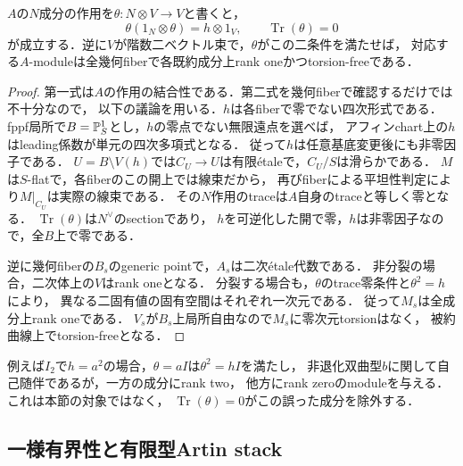 \begin{lemma}[trace零は非被約基底でも成立する]
\label{lem:qa-tf-trace-zero}
$A$の$N$成分の作用を$\theta:N\otimes V\to V$と書くと，
\[
 \theta(1_N\otimes\theta)=h\otimes1_V,
 \qquad\operatorname{Tr}(\theta)=0
\]
が成立する．逆に$V$が階数二ベクトル束で，$\theta$がこの二条件を満たせば，
対応する$A$-moduleは全幾何fiberで各既約成分上rank oneかつtorsion-freeである．
\end{lemma}
\begin{proof}
第一式は$A$の作用の結合性である．第二式を幾何fiberで確認するだけでは不十分なので，
以下の議論を用いる．$h$は各fiberで零でない四次形式である．
fppf局所で$B=\mathbb P^1_S$とし，$h$の零点でない無限遠点を選べば，
アフィンchart上の$h$はleading係数が単元の四次多項式となる．
従って$h$は任意基底変更後にも非零因子である．
$U=B\setminus V(h)$では$C_U\to U$は有限\'etaleで，$C_U/S$は滑らかである．
$M$は$S$-flatで，各fiberのこの開上では線束だから，
再びfiberによる平坦性判定により$M|_{C_U}$は実際の線束である．
その$N$作用のtraceは$A$自身のtraceと等しく零となる．
$\operatorname{Tr}(\theta)$は$N^\vee$のsectionであり，
$h$を可逆化した開で零，$h$は非零因子なので，全$B$上で零である．

逆に幾何fiberの$B_s$のgeneric pointで，$A_s$は二次\'etale代数である．
非分裂の場合，二次体上の$V$はrank oneとなる．
分裂する場合も，$\theta$のtrace零条件と$\theta^2=h$により，
異なる二固有値の固有空間はそれぞれ一次元である．
従って$M_s$は全成分上rank oneである．
$V_s$が$B_s$上局所自由なので$M_s$に零次元torsionはなく，
被約曲線上でtorsion-freeとなる．
\end{proof}

\begin{remark}
例えば$I_2$で$h=a^2$の場合，$\theta=aI$は$\theta^2=hI$を満たし，
非退化双曲型$b$に関して自己随伴であるが，一方の成分にrank two，
他方にrank zeroのmoduleを与える．これは本節の対象ではなく，
$\operatorname{Tr}(\theta)=0$がこの誤った成分を除外する．
\end{remark}

\subsection{一様有界性と有限型Artin stack}

